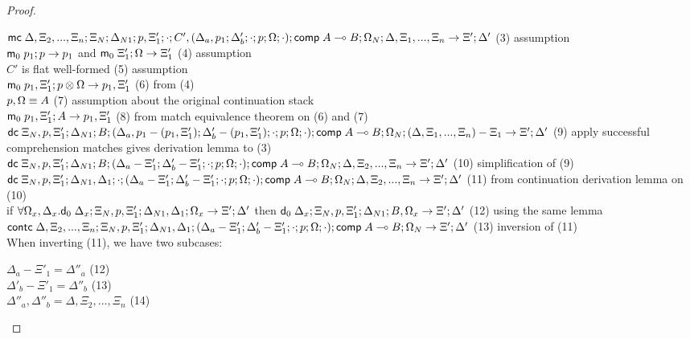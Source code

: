\begin{proof}
\begin{itemize}
      $\mathsf{mc} \; \Delta, \Xi_2, ..., \Xi_n; \Xi_N; \Delta_{N1}; p, \Xi'_1; \cdot; C', (\Delta_a, p_1; \Delta'_b; \cdot; p; \Omega; \cdot); \mathsf{comp} \; A \multimap B; \Omega_N; \Delta, \Xi_1, ..., \Xi_n \rightarrow \Xi'; \Delta'$ \hfill (3) assumption \\
      $\mathsf{m}_0 \; p_1; p \rightarrow p_1$ and $\mathsf{m}_0 \; \Xi'_1; \Omega \rightarrow \Xi'_1$ \hfill (4) assumption \\
      $C'$ is flat well-formed \hfill (5) assumption \\
      $\mathsf{m}_0 \; p_1, \Xi'_1; p \otimes \Omega \rightarrow p_1, \Xi'_1$ \hfill (6) from (4) \\
      $p, \Omega \equiv A$ \hfill (7) assumption about the original continuation stack \\
      $\mathsf{m}_0 \; p_1, \Xi'_1; A \rightarrow p_1, \Xi'_1$ \hfill (8) from match equivalence theorem on (6) and (7) \\
      $\mathsf{dc} \; \Xi_N, p, \Xi'_1; \Delta_{N1}; B; (\Delta_a, p_1 - (p_1, \Xi'_1); \Delta'_b - (p_1, \Xi'_1); \cdot; p; \Omega; \cdot); \mathsf{comp} \; A \multimap B; \Omega_N; (\Delta, \Xi_1, ..., \Xi_n) - \Xi_1 \rightarrow \Xi'; \Delta'$ \hfill (9) apply successful comprehension matches gives derivation lemma to (3) \\
      $\mathsf{dc} \; \Xi_N, p, \Xi'_1; \Delta_{N1}; B; (\Delta_a - \Xi'_1; \Delta'_b - \Xi'_1; \cdot; p; \Omega; \cdot); \mathsf{comp} \; A \multimap B; \Omega_N; \Delta, \Xi_2, ..., \Xi_n \rightarrow \Xi'; \Delta'$ \hfill (10) simplification of (9) \\
      $\mathsf{dc} \; \Xi_N, p, \Xi'_1; \Delta_{N1}, \Delta_1; \cdot; (\Delta_a - \Xi'_1; \Delta'_b - \Xi'_1; \cdot; p; \Omega; \cdot); \mathsf{comp} \; A \multimap B; \Omega_N; \Delta, \Xi_2, ..., \Xi_n \rightarrow \Xi'; \Delta'$ \hfill (11) from continuation derivation lemma on (10)\\
      if $\forall \Omega_x, \Delta_x. \mathsf{d}_0 \; \Delta_x; \Xi_N, p, \Xi'_1; \Delta_{N1}, \Delta_1; \Omega_x \rightarrow \Xi'; \Delta'$ then $\mathsf{d}_0 \; \Delta_x; \Xi_N, p, \Xi'_1; \Delta_{N1}; B, \Omega_x \rightarrow \Xi'; \Delta'$ \hfill (12) using the same lemma \\
      $\mathsf{contc} \; \Delta, \Xi_2, ..., \Xi_n; \Xi_N, p, \Xi'_1; \Delta_{N1}, \Delta_1; (\Delta_a - \Xi'_1; \Delta'_b - \Xi'_1; \cdot; p; \Omega; \cdot); \mathsf{comp} \; A \multimap B; \Omega_N \rightarrow \Xi'; \Delta'$ \hfill (13) inversion of (11) \\   
      
      When inverting (11), we have two subcases:
      
      $\Delta_a - \Xi'_1 = \Delta''_a$ \hfill (12) \\
      $\Delta'_b - \Xi'_1 = \Delta''_b$ \hfill (13) \\
      $\Delta''_a, \Delta''_b = \Delta, \Xi_2, ..., \Xi_n$ \hfill (14) \\
      

\end{itemize}
\end{proof}
